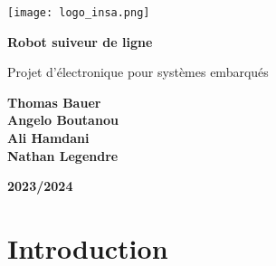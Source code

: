 \documentclass[12pt]{article}
\begin{document}
\begin{titlepage}
    \centering
    
    \texttt{[image: logo\_insa.png]}\par\vspace{1cm}
    
    {\LARGE\bfseries Robot suiveur de ligne\par}
    
    {\Large Projet d'électronique pour systèmes embarqués\par}
    
    \vspace{2cm}
    
    \vfill
    \begin{flushleft}
        \textbf{Thomas Bauer}\\
        \textbf{Angelo Boutanou}\\
        \textbf{Ali Hamdani}\\
        \textbf{Nathan Legendre}
    \end{flushleft}
        \vfill
    \begin{flushright}
        \textbf{2023/2024}
    \end{flushright}
    
\end{titlepage}

\newpage

\section*{Introduction}

\end{document}
